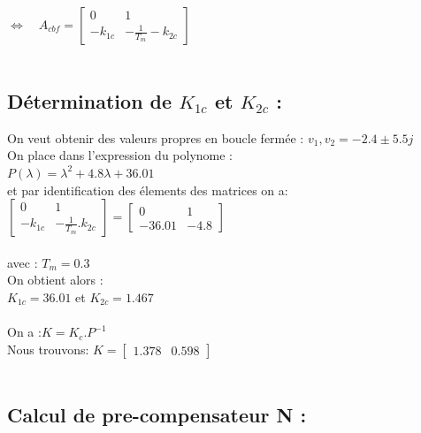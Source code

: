 $\Longleftrightarrow \quad
A_{cbf}=\begin{bmatrix}
          0&1\\
          -k_{1c}&-\frac{1}{T_{m}}-k_{2c}
         \end{bmatrix}$\\\\
         
\subsection{Détermination de $K_{1c}$ et $K_{2c}$ :}

On veut obtenir des valeurs propres en boucle fermée : $v_{1},v_{2}=-2.4\pm5.5j$ \\         
         
On place dans l'expression du polynome :\\

$P(\lambda)={\lambda}^2+4.8\lambda+36.01$\\

et par identification des élements des matrices on a:\\
$\begin{bmatrix}
 0&1\\
 -k_{1c}&-\frac{1}{T_{m}}.k_{2c}
  \end{bmatrix}=\begin{bmatrix}
    0&1\\
   -36.01&-4.8
  \end{bmatrix}$\\\\
  avec : $T_{m}=0.3$\\

  
On obtient alors :\\
 $K_{1c}=36.01$ \quad
 et $K_{2c}=1.467$ \\\\

On a :$K=K_c.P^{-1}$ \\

Nous trouvons: $K=\begin{bmatrix}
               1.378&0.598
               \end{bmatrix}  $\\\\ 
                     
         
\subsection{Calcul de pre-compensateur N :}

